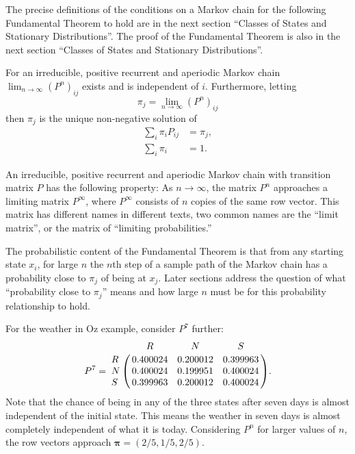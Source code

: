 \documentclass[12pt]{article}
\begin{document}
The precise definitions of the conditions on a Markov chain for the
following Fundamental Theorem to hold are in the next section ``Classes
of States and Stationary Distributions''.  The proof of the Fundamental
Theorem is also in the next section ``Classes of States and Stationary
Distributions''.
\begin{theorem}
    For an irreducible, positive recurrent and aperiodic Markov chain \(
    \lim_{n \to \infty} (P^n)_{ij} \) exists and is independent of \( i \).
    Furthermore, letting
    \[
        \pi_j = \lim_{n \to \infty} (P^n)_{ij}
    \] then \( \pi_j \) is the unique non-negative solution of
    \begin{align*}
        \sum\limits_{i} \pi_{i} P_{ij} &= \pi_{j},\\
        \sum\limits_{i} \pi_{i} &= 1.%
    \end{align*}
\end{theorem}

An irreducible, positive recurrent and aperiodic Markov chain with
transition matrix \( P \) has the following property:  As \( n\to\infty \),
the matrix \( P^n \) approaches a limiting matrix \( P^\infty \), where \(
P^\infty \) consists of \( n \) copies of the same row vector.  This
matrix has different names in different texts, two common names are the
``limit matrix'', or the matrix of ``limiting probabilities.''%

The probabilistic content of the Fundamental Theorem is that from any
starting state \( x_i \), for large \( n \) the \( n \)th step of a
sample path of the Markov chain has a probability close to \( \pi_j \)
of being at \( x_j \).  Later sections address the
question of what ``probability close to \( \pi_j \)'' means and how
large \( n \) must be for this probability relationship to hold.

\begin{example}
  For the weather in Oz example, consider \( P^7 \) further:
      \[
        P^7 = \bordermatrix{ & R & N & S \cr
        R & 0.400024 & 0.200012 & 0.399963 \cr
        N & 0.400024 & 0.199951 & 0.400024 \cr
        S & 0.399963 & 0.200012 & 0.400024 }.
    \]  Note that the chance of being in any of the three states after
    seven days is almost independent of the initial state.  This means
    the weather in seven days is almost completely independent of what
    it is today.  Considering \( P^n \) for larger values of \( n \),
    the row vectors approach \( \mathbf{\pi}=(2/5,1/5,2/5) \).
\end{example}
\end{document}
